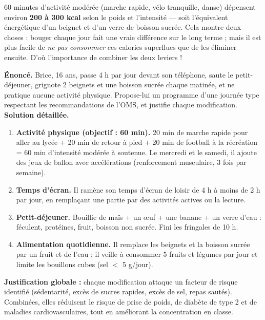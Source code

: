 \documentclass[11pt]{article}
\begin{document}
\begin{savaistu}
60 minutes d'activité modérée (marche rapide, vélo tranquille, danse) dépensent environ \textbf{200 à 300 kcal} selon le poids et l'intensité — soit l'équivalent énergétique d'un beignet et d'un verre de boisson sucrée. Cela montre deux choses : bouger chaque jour fait une vraie différence sur le long terme ; mais il est plus facile de \emph{ne pas consommer} ces calories superflues que de les éliminer ensuite. D'où l'importance de combiner les deux leviers !
\end{savaistu}

\begin{exoresolu}
\textbf{Énoncé.} Brice, 16 ans, passe 4 h par jour devant son téléphone, saute le petit-déjeuner, grignote 2 beignets et une boisson sucrée chaque matinée, et ne pratique aucune activité physique. Propose-lui un programme d'une journée type respectant les recommandations de l'OMS, et justifie chaque modification.
\tcblower
\textbf{Solution détaillée.}
\begin{enumerate}
\item \textbf{Activité physique (objectif : 60 min).} 20 min de marche rapide pour aller au lycée + 20 min de retour à pied + 20 min de football à la récréation = 60 min d'intensité modérée à soutenue. Le mercredi et le samedi, il ajoute des jeux de ballon avec accélérations (renforcement musculaire, 3 fois par semaine).
\item \textbf{Temps d'écran.} Il ramène son temps d'écran de loisir de 4 h à moins de 2 h par jour, en remplaçant une partie par des activités actives ou la lecture.
\item \textbf{Petit-déjeuner.} Bouillie de maïs + un œuf + une banane + un verre d'eau : féculent, protéines, fruit, boisson non sucrée. Fini les fringales de 10 h.
\item \textbf{Alimentation quotidienne.} Il remplace les beignets et la boisson sucrée par un fruit et de l'eau ; il veille à consommer 5 fruits et légumes par jour et limite les bouillons cubes (sel $<$ 5 g/jour).
\end{enumerate}
\textbf{Justification globale :} chaque modification attaque un facteur de risque identifié (sédentarité, excès de sucres rapides, excès de sel, repas sautés). Combinées, elles réduisent le risque de prise de poids, de diabète de type 2 et de maladies cardiovasculaires, tout en améliorant la concentration en classe.
\end{exoresolu}
\end{document}
